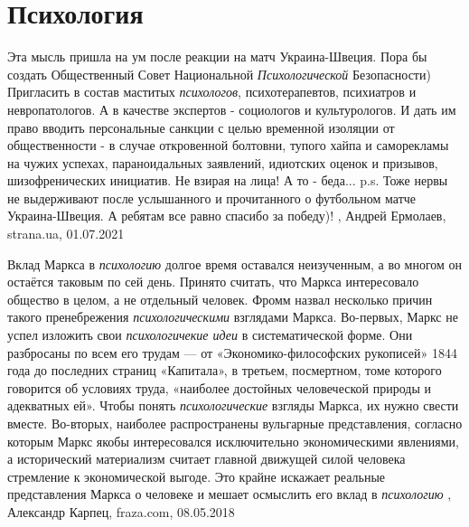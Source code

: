  
 
 
 
 
\chapter{Психология}
\label{sec:slova.psihologia}

Эта мысль пришла на ум после реакции на матч Украина-Швеция. Пора бы создать
Общественный Совет Национальной \emph{Психологической} Безопасности) Пригласить
в состав маститых \emph{психологов}, психотерапевтов, психиатров и
невропатологов. А в качестве экспертов - социологов и культурологов. И дать им
право вводить персональные санкции с целью временной изоляции от общественности
- в случае откровенной болтовни, тупого хайпа и саморекламы на чужих успехах,
параноидальных заявлений, идиотских оценок и призывов, шизофренических
инициатив.  Не взирая на лица!  А то - беда...  p.s. Тоже нервы не выдерживают
после услышанного и прочитанного о футбольном матче Украина-Швеция.  А ребятам
все равно спасибо за победу)!
, 
Андрей Ермолаев, strana.ua, 01.07.2021

Вклад Маркса в \emph{психологию} долгое время оставался неизученным, а во многом он
остаётся таковым по сей день. Принято считать, что Маркса интересовало общество
в целом, а не отдельный человек. Фромм назвал несколько причин такого
пренебрежения \emph{психологическими} взглядами Маркса.  Во-первых, Маркс не успел
изложить свои \emph{психологичекие идеи} в систематической форме. Они разбросаны по
всем его трудам — от «Экономико-философских рукописей» 1844 года до последних
страниц «Капитала», в третьем, посмертном, томе которого говорится об условиях
труда, «наиболее достойных человеческой природы и адекватных ей». Чтобы понять
\emph{психологические} взгляды Маркса, их нужно свести вместе.  Во-вторых, наиболее
распространены вульгарные представления, согласно которым Маркс якобы
интересовался исключительно экономическими явлениями, а исторический
материализм считает главной движущей силой человека стремление к экономической
выгоде. Это крайне искажает реальные представления Маркса о человеке и мешает
осмыслить его вклад в \emph{психологию}
, 
Александр Карпец, fraza.com, 08.05.2018

